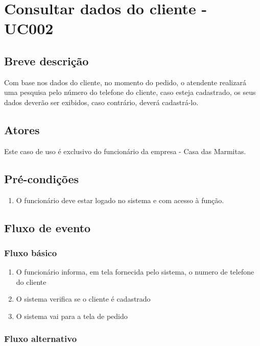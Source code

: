 \chapter{Consultar dados do cliente - UC002} \label{uc002}

\section{Breve descrição}

Com base nos dados do cliente, no momento do pedido, o atendente realizará uma pesquisa pelo número do telefone do cliente, caso esteja cadastrado, os seus dados deverão ser exibidos, caso contrário, deverá cadastrá-lo.

\section{Atores}

Este caso de uso é exclusivo do funcionário da empresa - Casa das Marmitas.

\section{Pré-condições}

\begin{enumerate}
	\item O funcionário deve estar logado no sistema e com acesso à função.
\end{enumerate}

\section{Fluxo de evento}

\subsection{Fluxo básico}

\begin{enumerate}
	\item O funcionário informa, em tela fornecida pelo sistema, o numero de telefone do cliente	
	\item O sistema verifica se o cliente é cadastrado
	\item O sistema vai para a tela de pedido
\end{enumerate}

\subsection{Fluxo alternativo}

